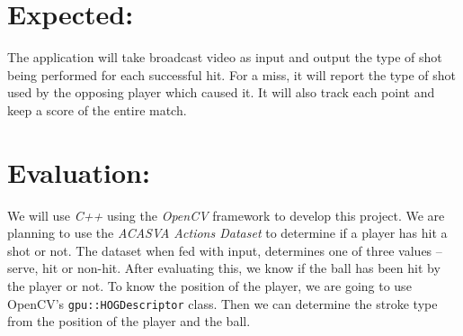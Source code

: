 \documentclass[10.5pt]{article}
\begin{document}
    \section{Expected:}
    The application will take broadcast video as input and output the type of shot being performed for each successful hit. For a miss, it will report the type of shot used by the opposing player which caused it. It will also track each point and keep a score of the entire match.
    
    \section{Evaluation:}
    We will use \textit{C++} using the \textit{OpenCV} framework to develop this project. We are planning to use the \textit{ACASVA Actions Dataset}\cite{acasva} to determine if a player has hit a shot or not. The dataset when fed with input, determines one of three values -- serve, hit or non-hit. After evaluating this, we know if the ball has been hit by the player or not. To know the position of the player, we are going to use OpenCV's \texttt{gpu::HOGDescriptor}\cite{hog} class. Then we can determine the stroke type from the position of the player and the ball.
\end{document}
